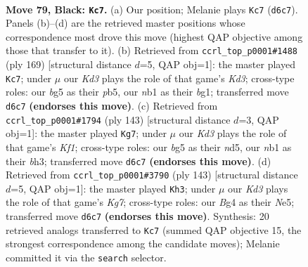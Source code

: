 \documentclass[11pt]{article}
\begin{document}
\clearpage

\begin{figure}[p]\centering
\begin{subfigure}{0.46\textwidth}\centering
\resizebox{\linewidth}{!}{%
\newchessgame
\chessboard[
  setfen={8/8/3k4/6B1/p1p3b1/8/5K2/1N6 b - - 13 79},
  showmover=false,
  pgfstyle=straightmove, color=movearrow, markmove={d6-c7}
]}
\caption{}
\end{subfigure}\hfill
\begin{subfigure}{0.46\textwidth}\centering
\resizebox{\linewidth}{!}{%
\newchessgame
\chessboard[
  setfen={8/8/3k4/1P5b/5p2/8/3K4/6B1 b - - 9 85},
  showmover=false,
  pgfstyle=straightmove, color=movearrow, markmove={d6-c7}
]}
\caption{}
\end{subfigure}
\\[4pt]
\begin{subfigure}{0.46\textwidth}\centering
\resizebox{\linewidth}{!}{%
\newchessgame
\chessboard[
  setfen={5k2/b7/8/3N4/7p/7B/3K4/8 b - - 10 72},
  showmover=false,
  pgfstyle=straightmove, color=movearrow, markmove={f8-g7}
]}
\caption{}
\end{subfigure}\hfill
\begin{subfigure}{0.46\textwidth}\centering
\resizebox{\linewidth}{!}{%
\newchessgame
\chessboard[
  setfen={8/8/7p/4n2N/1B6/8/4K1k1/8 b - - 11 72},
  showmover=false,
  pgfstyle=straightmove, color=movearrow, markmove={g2-h3}
]}
\caption{}
\end{subfigure}
\caption{\textbf{Move 79, Black: \texttt{Kc7}.} (a) Our position; Melanie plays \texttt{Kc7} (\texttt{d6c7}). Panels (b)--(d) are the retrieved master positions whose correspondence most drove this move (highest QAP objective among those that transfer to it). (b) Retrieved from \texttt{ccrl\_top\_p0001\#1488} (ply 169) [structural distance $d$=5, QAP obj=1]: the master played \texttt{Kc7}; under $\mu$ our \emph{Kd3} plays the role of that game's \emph{Kd3}; cross-type roles: our \emph{b}g5 as their \emph{p}b5, our \emph{n}b1 as their \emph{b}g1; transferred move \texttt{d6c7} \textbf{(endorses this move)}. (c) Retrieved from \texttt{ccrl\_top\_p0001\#1794} (ply 143) [structural distance $d$=3, QAP obj=1]: the master played \texttt{Kg7}; under $\mu$ our \emph{Kd3} plays the role of that game's \emph{Kf1}; cross-type roles: our \emph{b}g5 as their \emph{n}d5, our \emph{n}b1 as their \emph{b}h3; transferred move \texttt{d6c7} \textbf{(endorses this move)}. (d) Retrieved from \texttt{ccrl\_top\_p0001\#3790} (ply 143) [structural distance $d$=5, QAP obj=1]: the master played \texttt{Kh3}; under $\mu$ our \emph{Kd3} plays the role of that game's \emph{Kg7}; cross-type roles: our \emph{B}g4 as their \emph{N}e5; transferred move \texttt{d6c7} \textbf{(endorses this move)}. Synthesis: 20 retrieved analogs transferred to \texttt{Kc7} (summed QAP objective 15, the strongest correspondence among the candidate moves); Melanie committed it via the \texttt{search} selector.}
\label{fig:thought-m157}
\end{figure}
\end{document}
